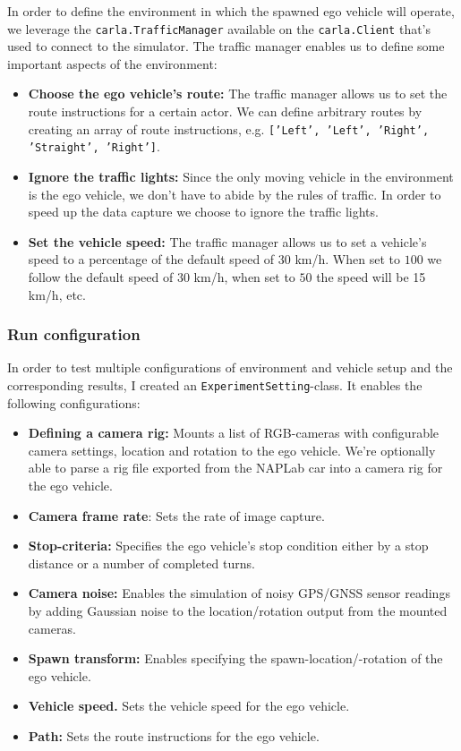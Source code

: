 In order to define the environment in which the spawned ego vehicle will operate, we leverage the \texttt{carla.TrafficManager} available on the \texttt{carla.Client} that's used to connect to the simulator. The traffic manager enables us to define some important aspects of the environment:

\begin{itemize}
    \item \textbf{Choose the ego vehicle's route:} The traffic manager allows us to set the route instructions for a certain actor. We can define arbitrary routes by creating an array of route instructions, e.g. \texttt{['Left', 'Left', 'Right', 'Straight', 'Right']}.
    \item \textbf{Ignore the traffic lights:} Since the only moving vehicle in the environment is the ego vehicle, we don't have to abide by the rules of traffic. In order to speed up the data capture we choose to ignore the traffic lights.
    \item \textbf{Set the vehicle speed:} The traffic manager allows us to set a vehicle's speed to a percentage of the default speed of 30 km/h. When set to $100$ we follow the default speed of 30 km/h, when set to $50$ the speed will be 15 km/h, etc.
\end{itemize}


\subsubsection{Run configuration}

In order to test multiple configurations of environment and vehicle setup and the corresponding results, I created an \texttt{ExperimentSetting}-class. It enables the following configurations:

\begin{itemize}
    \item \textbf{Defining a camera rig:} Mounts a list of RGB-cameras with configurable camera settings, location and rotation to the ego vehicle. We're optionally able to parse a rig file exported from the NAPLab car into a camera rig for the ego vehicle.
    \item \textbf{Camera frame rate}: Sets the rate of image capture.
    \item \textbf{Stop-criteria:} Specifies the ego vehicle's stop condition either by a stop distance or a number of completed turns.
    \item \textbf{Camera noise:} Enables the simulation of noisy GPS/GNSS sensor readings by adding Gaussian noise to the location/rotation output from the mounted cameras.
    \item \textbf{Spawn transform:} Enables specifying the spawn-location/-rotation of the ego vehicle.
    \item \textbf{Vehicle speed.} Sets the vehicle speed for the ego vehicle.
    \item \textbf{Path:} Sets the route instructions for the ego vehicle.
\end{itemize}



